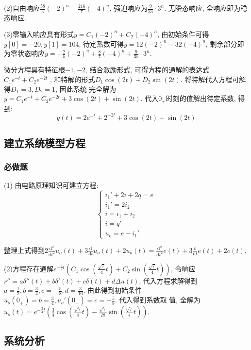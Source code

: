 (2)自由响应$\frac{58}{5}(-2)^n-\frac{216}{7}(-4)^n$, 强迫响应为$\frac{9}{35}\cdot
3^n$. 无瞬态响应, 全响应即为稳态响应.

(3)零输入响应具有形式$y=C_1(-2)^n+C_2(-4)^n$, 由初始条件可得$y[0]=-20, y[1]=104$,
待定系数可得$y=12(-2)^n-32(-4)^n$, 剩余部分即为零状态响应$y=-\frac{2}{5}(-2)^n+
\frac{8}{7}(-4)^n+\frac{9}{35}\cdot3^n$.


微分方程具有特征根$-1,-2$, 结合激励形式, 可得方程的通解的表达式$C_1e^{-t}+C_2e^{-2t}$
, 和特解的形式$D_1\cos(2t)+D_2\sin(2t)$. 将特解代入方程可解得$D_1=3,D_2=1$, 因此系统
完全解为$y=C_1e^{-t}+C_2e^{-2t}+3\cos(2t)+\sin(2t)$. 代入$0_+$时刻的值解出待定系数,
得到: $$y(t)=2e^{-t}+2^{-2t}+3\cos(2t)+\sin(2t)$$

\subsection{建立系统模型方程}

\subsubsection{必做题}

(1) 由电路原理知识可建立方程:
\begin{equation*}
    \left\{
        \begin{array}{l}
            i_1'+2i+2q=e \\
            i_1'=2i_2 \\
            i = i_1 + i_2 \\
            i = q' \\
            u_o=e-i_1'
        \end{array}
    \right.
\end{equation*}

整理上式得到$2\frac{\mathrm d^2}{\mathrm dt^2}u_o(t)+3\frac{\mathrm d}{\mathrm dt
}u_o(t)+2u_o(t)=\frac{\mathrm d^2}{\mathrm dt^2}e(t)+3\frac{\mathrm d}{\mathrm d
t}e(t)+2e(t)$.

(2)方程存在通解$e^{-\frac{3}{4}t}(C_1\cos(\frac{\sqrt{7}}{4}t)+C_2\sin(\frac{
\sqrt{7}}{4}t))$, 令响应$r''=a\delta''(t)+b\delta'(t)+c\delta(t)+d\Delta u(t)$,
代入方程求解得到$a=\frac{1}{2}, b=\frac{3}{4}, c=-\frac{5}{8}, d=\frac{3}{16}$. 
由此得到初始条件$u_o(0_+)=b=\frac{3}{4}, u_o'(0_+)=c=-\frac{5}{8}$. 代入得到系数取
值, 全解为$u_o(t)=e^{-\frac{3}{4}t}(\frac{3}{4}\cos(\frac{\sqrt{7}}{4}t)-\frac{
\sqrt{7}}{28}\sin(\frac{\sqrt{7}}{4}t))$.

\subsection{系统分析}

